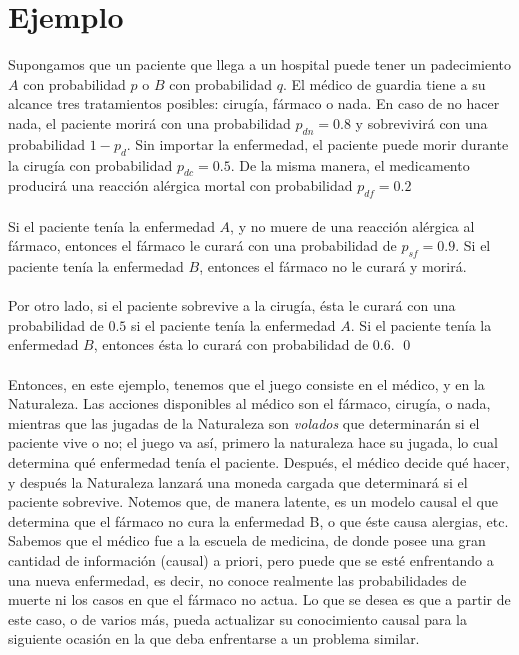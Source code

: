 \documentclass[11pt]{article}
\theoremstyle{plain}
\begin{document}
\section{Ejemplo}
Supongamos que un paciente que llega a un hospital puede tener un padecimiento $A$ con probabilidad $p$ o $B$ con probabilidad $q$. El médico de guardia tiene a su alcance tres tratamientos posibles: cirugía, fármaco o nada. En caso de no hacer nada, el paciente morirá con una probabilidad $p_{dn}=0.8$ y sobrevivirá con una probabilidad $1-p_d$. Sin importar la enfermedad, el paciente puede morir durante la cirugía con probabilidad $p_{dc}=0.5$. De la misma manera, el medicamento producirá una reacción alérgica mortal con probabilidad $p_{df}=0.2$\\
\\
Si el paciente tenía la enfermedad $A$, y no muere de una reacción alérgica al fármaco, entonces el fármaco le curará con una probabilidad de $p_{sf}=0.9$. Si el paciente tenía la enfermedad $B$, entonces el fármaco no le curará y morirá.\\
\\
Por otro lado, si el paciente sobrevive a la cirugía, ésta le curará con una probabilidad de $0.5$ si el paciente tenía la enfermedad $A$. Si el paciente tenía la enfermedad $B$, entonces ésta lo curará con probabilidad de $0.6$. \qed
\\
\\
Entonces, en este ejemplo, tenemos que el juego consiste en el médico, y en la Naturaleza. Las acciones disponibles al médico son el fármaco, cirugía, o nada, mientras que las jugadas de la Naturaleza son \textit{volados} que determinarán si el paciente vive o no; el juego va así, primero la naturaleza hace su jugada, lo cual determina qué enfermedad tenía el paciente. Después, el médico decide qué hacer, y después la Naturaleza lanzará una moneda cargada que determinará si el paciente sobrevive. Notemos que, de manera latente, es un modelo causal el que determina que el fármaco no cura la enfermedad B, o que éste causa alergias, etc. 
\\
Sabemos que el médico fue a la escuela de medicina, de donde posee una gran cantidad de información (causal) a priori, pero puede que se esté enfrentando a una nueva enfermedad, es decir, no conoce realmente las probabilidades de muerte ni los casos en que el fármaco no actua. Lo que se desea es que a partir de este caso, o de varios más, pueda actualizar su conocimiento causal para la siguiente ocasión en la que deba enfrentarse a  un problema similar.



\end{document}
